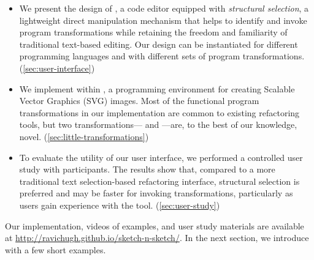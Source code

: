 \begin{itemize}

\item We present the design of \deuce{}, a code editor equipped with
\emph{structural \maybecode{} selection}, a lightweight direct manipulation mechanism
that helps to identify and invoke program transformations while
retaining the freedom and familiarity of traditional text-based editing. Our
design can be instantiated for different programming languages and with
different sets of program transformations.
(\autoref{sec:user-interface})

\item We implement \deuce{} within \sns{}, a programming
environment for creating Scalable Vector Graphics (SVG) images.
Most of the functional program transformations in our implementation
are common to existing refactoring tools, but two
transformations--- and ---are,
to the best of our knowledge, novel.
(\autoref{sec:little-transformations})

\item To evaluate the utility of our user interface, we
performed a controlled user study with \numUsers{} participants. The results
show that, compared to a more traditional text selection-based refactoring
interface, structural \maybecode{} selection is
preferred and may be faster for invoking
transformations, particularly as users gain experience with the tool.
(\autoref{sec:user-study})

\end{itemize}

\noindent
Our implementation, videos of examples, and
user study materials are available at
\url{http://ravichugh.github.io/sketch-n-sketch/}.
%
In the next section, we introduce \deuce{} with a few short examples.
